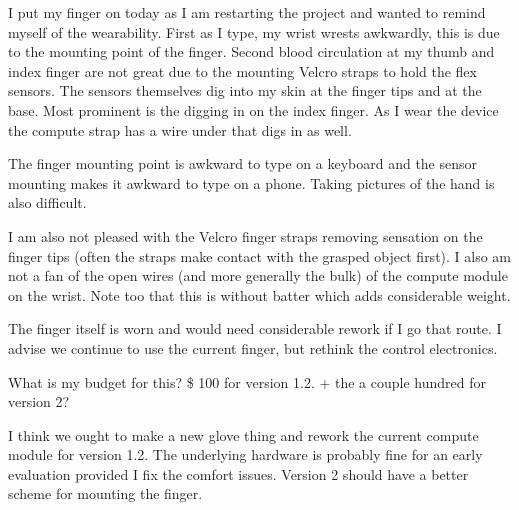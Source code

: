 I put my finger on today as I am restarting the project and wanted to remind myself of the wearability. First as I type, my wrist  wrests awkwardly, this is due to the mounting point of the finger. Second blood circulation at my thumb and index finger are not great due to the mounting Velcro straps to hold the flex sensors. The sensors themselves dig into my skin at the finger tips and at the base. Most prominent is the digging in on the index finger. As I wear the device the compute strap has a wire under that digs in as well. 

The finger mounting point is awkward to type on a keyboard and the sensor mounting makes it awkward to type on a phone. Taking pictures of the hand is also difficult. 

I am also not pleased with the Velcro finger straps removing sensation on the finger tips (often the straps make contact with the grasped object first). I also am not a fan of the open wires (and more generally the bulk) of the compute module on the wrist. Note too that this is without batter which adds considerable weight. 

The finger itself is worn and would need considerable rework if I go that route. I advise we continue to use the current finger, but rethink the control electronics.



What is my budget for this? \$ 100 for version 1.2. + the a couple hundred for version 2?

I think we ought to make a new glove thing and rework the current compute module for version 1.2. The underlying hardware is probably fine for an early evaluation provided I fix the comfort issues. Version 2 should have a better scheme for mounting the finger. 